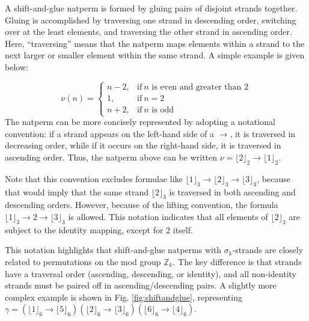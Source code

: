 \documentclass[12pt,reqno]{article}
\begin{document}
A shift-and-glue natperm is formed by gluing pairs of disjoint strands together. Gluing is accomplished by traversing one strand in descending order, switching over at the least elements, and traversing the other strand in ascending order. Here, ``traversing'' means that the natperm maps elements within a strand to the next larger or smaller element within the same strand. A simple example is given below:

\begin{equation}
    \nu(n) = \begin{cases}
        n - 2, & \text{if}\ n \text{ is even and greater than 2} \\
        1, & \text{if}\ n = 2 \\
        n + 2, & \text{if}\ n \text{ is odd} 
    \end{cases}
\end{equation}
The natperm can be more concisely represented by adopting a notational convention: if a strand appears on the left-hand side of a $\rightarrow$, it is traversed in decreasing order, while if it occurs on the right-hand side, it is traversed in ascending order. Thus, the natperm above can be written $\nu = {\lfloor 2 \rfloor}_2 \rightarrow {\lfloor 1 \rfloor}_2$.

Note that this convention excludes formulae like ${\lfloor 1 \rfloor}_3 \rightarrow {\lfloor 2 \rfloor}_3 \rightarrow {\lfloor 3 \rfloor}_3$, because that would imply that the same strand ${\lfloor 2 \rfloor}_3$ is traversed in both ascending and descending orders. However, because of the lifting convention, the formula ${\lfloor 1 \rfloor}_3 \rightarrow 2 \rightarrow {\lfloor 3 \rfloor}_3$ is allowed. This notation indicates that all elements of ${\lfloor 2 \rfloor}_3$ are subject to the identity mapping, except for $2$ itself.

This notation highlights that shift-and-glue natperms with $\sigma_k$-strands are closely related to permutations on the mod group $\mathbb{Z}_{k}$. The key difference is that strands have a traversal order (ascending, descending, or identity), and all non-identity strands must be paired off in ascending/descending pairs. A slightly more complex example is shown in Fig. \ref{fig:shiftandglue}, representing $\gamma = ( \lfloor 1 \rfloor_6 \rightarrow \lfloor 5 \rfloor_6 ) ( \lfloor 2 \rfloor_6 \rightarrow \lfloor 3 \rfloor_6 ) ( \lfloor 6 \rfloor_6 \rightarrow \lfloor 4 \rfloor_6 )$.
\end{document}
